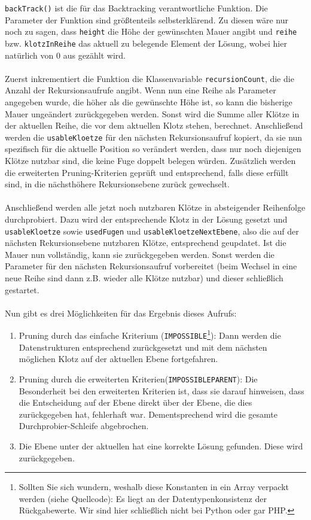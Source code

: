 \documentclass[a4paper, notitlepage, 12pt]{scrartcl}
\begin{document}
\texttt{backTrack()} ist die für das Backtracking verantwortliche Funktion. Die Parameter der Funktion sind größtenteils selbsterklärend. Zu diesen wäre nur noch zu sagen, dass \texttt{height} die Höhe der gewünschten Mauer angibt und \texttt{reihe} bzw. \texttt{klotzInReihe} das aktuell zu belegende Element der Lösung, wobei hier natürlich von 0 aus gezählt wird.
\\ \\
Zuerst inkrementiert die Funktion die Klassenvariable \texttt{recursionCount}, die die Anzahl der Rekursionsaufrufe angibt. Wenn nun eine Reihe als Parameter angegeben wurde, die höher als die gewünschte Höhe ist, so kann die bisherige Mauer ungeändert zurückgegeben werden. Sonst wird die Summe aller Klötze in der aktuellen Reihe, die vor dem aktuellen Klotz stehen, berechnet. Anschließend werden die \texttt{usableKloetze} für den nächsten Rekursionsaufruf kopiert, da sie nun spezifisch für die aktuelle Position so verändert werden, dass nur noch diejenigen Klötze nutzbar sind, die keine Fuge doppelt belegen würden. Zusätzlich werden die erweiterten Pruning-Kriterien geprüft und entsprechend, falls diese erfüllt sind, in die nächsthöhere Rekursionsebene zurück gewechselt.
\\ \\
Anschließend werden alle jetzt noch nutzbaren Klötze in absteigender Reihenfolge durchprobiert. Dazu wird der entsprechende Klotz in der Lösung gesetzt und \texttt{usableKloetze} sowie \texttt{usedFugen} und \texttt{usableKloetzeNextEbene}, also die auf der nächsten Rekursionsebene nutzbaren Klötze, entsprechend geupdatet. Ist die Mauer nun vollständig, kann sie zurückgegeben werden. Sonst werden die Parameter für den nächsten Rekursionsaufruf vorbereitet (beim Wechsel in eine neue Reihe sind dann z.B. wieder alle Klötze nutzbar) und dieser schließlich gestartet.
\\ \\
Nun gibt es drei Möglichkeiten für das Ergebnis dieses Aufrufs:
\begin{enumerate}
\item Pruning durch das einfache Kriterium (\texttt{IMPOSSIBLE}\footnote{Sollten Sie sich wundern, weshalb diese Konstanten in ein Array verpackt werden (siehe Quellcode): Es liegt an der Datentypenkonsistenz der Rückgabewerte. Wir sind hier schließlich nicht bei Python oder gar PHP.}): Dann werden die Datenstrukturen entsprechend zurückgesetzt und mit dem nächsten möglichen Klotz auf der aktuellen Ebene fortgefahren.
\item Pruning durch die erweiterten Kriterien(\texttt{IMPOSSIBLEPARENT}): Die Besonderheit bei den erweiterten Kriterien ist, dass sie darauf hinweisen, dass die Entscheidung auf der Ebene direkt über der Ebene, die dies zurückgegeben hat, fehlerhaft war. Dementsprechend wird die gesamte Durchprobier-Schleife abgebrochen.
\item Die Ebene unter der aktuellen hat eine korrekte Lösung gefunden. Diese wird zurückgegeben.
\end{enumerate}
\end{document}
